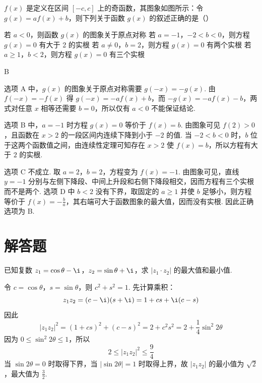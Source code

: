 \begin{problem}
\(f(x)\) 是定义在区间 \([-c, c]\) 上的奇函数，其图象如图所示：令 \(g(x) = a f(x) + b\)，则下列关于函数 \(g(x)\) 的叙述正确的是（\quad）


\choices
    {若 \(a < 0\)，则函数 \(g(x)\) 的图象关于原点对称}
    {若 \(a = -1\)，\(-2 < b < 0\)，则方程 \(g(x) = 0\) 有大于 2 的实根}
    {若 \(a \neq 0\)，\(b = 2\)，则方程 \(g(x) = 0\) 有两个实根}
    {若 \(a \geqslant 1\)，\(b < 2\)，则方程 \(g(x) = 0\) 有三个实根}
\end{problem}

\begin{answer}
B
\end{answer}

\begin{solution}
选项 A 中，\(g(x)\) 的图象关于原点对称需要 \(g(-x)=-g(x)\). 由 \(f(-x)=-f(x)\) 得 \(g(-x)=-af(x)+b\)，而 \(-g(x)=-af(x)-b\)，两式对任意 \(x\) 相等还需要 \(b=0\)，所以仅有 \(a<0\) 不能保证结论.

选项 B 中，\(a=-1\) 时方程 \(g(x)=0\) 等价于 \(f(x)=b\). 由图象可见 \(f(2)>0\)，且函数在 \(x>2\) 的一段区间内连续下降到小于 \(-2\) 的值. 当 \(-2<b<0\) 时，\(b\) 位于这两个函数值之间，由连续性定理可知存在 \(x>2\) 使 \(f(x)=b\)，所以方程有大于 \(2\) 的实根.

选项 C 不成立. 取 \(a=2\)，\(b=2\)，方程变为 \(f(x)=-1\). 由图象可见，直线 \(y=-1\) 分别与左侧下降段、中间上升段和右侧下降段相交，因而方程有三个实根而不是两个. 选项 D 中 \(b<2\) 没有下界，取固定的 \(a\geqslant1\) 并使 \(b\) 足够小，则方程等价于 \(f(x)=-\frac{b}{a}\)，其右端可大于函数图象的最大值，因而没有实根. 因此正确选项为 B.
\end{solution}

\section{解答题}
\begin{problem}
已知复数 \(z_{1} = \cos \theta - \i\)，\(z_{2} = \sin \theta + \i\)，求 \(|z_{1} \cdot z_{2}|\) 的最大值和最小值.
\end{problem}

\begin{solution}
令 \(c=\cos\theta\)，\(s=\sin\theta\)，则 \(c^{2}+s^{2}=1\). 先计算乘积：
\[
z_{1}z_{2}=(c-\i)(s+\i)=1+cs+\i(c-s)
\]
因此
\[
|z_{1}z_{2}|^{2}=(1+cs)^{2}+(c-s)^{2}=2+c^{2}s^{2}=2+\frac14\sin^{2}2\theta
\]
因为 \(0\leqslant\sin^{2}2\theta\leqslant1\)，所以
\[
2\leqslant |z_{1}z_{2}|^{2}\leqslant\frac94
\]
当 \(\sin2\theta=0\) 时取得下界，当 \(|\sin2\theta|=1\) 时取得上界，故 \(|z_{1}z_{2}|\) 的最小值为 \(\sqrt2\)，最大值为 \(\frac32\).
\end{solution}

